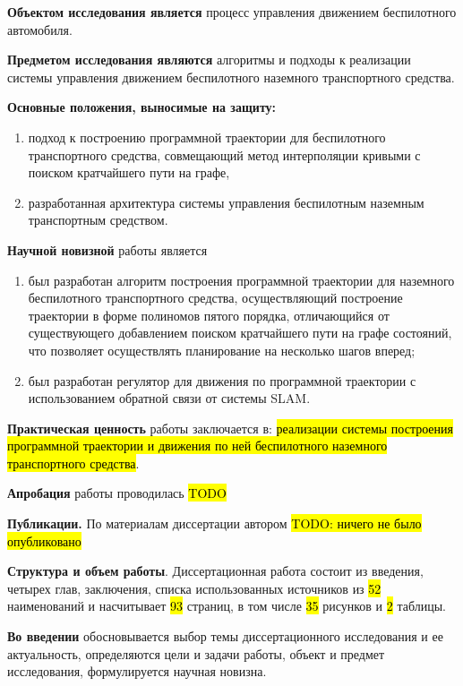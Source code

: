 \textbf{Объектом исследования является} процесс управления движением беспилотного автомобиля.

\textbf{Предметом исследования являются} алгоритмы и подходы к реализации системы управления движением
беспилотного наземного транспортного средства.

\textbf{Основные положения, выносимые на защиту:}
\begin{enumerate}
    \item подход к построению программной траектории для беспилотного транспортного средства, совмещающий метод
          интерполяции кривыми с поиском кратчайшего пути на графе,
    \item разработанная архитектура системы управления беспилотным наземным транспортным средством.
\end{enumerate}

\textbf{Научной новизной} работы является
\begin{enumerate}
    \item был разработан алгоритм построения программной траектории для наземного беспилотного транспортного
          средства, осуществляющий построение траектории в форме полиномов пятого порядка, отличающийся от существующего
          добавлением поиском кратчайшего пути на графе состояний, что позволяет осуществлять планирование на несколько
          шагов вперед;
    \item был разработан регулятор для движения по программной траектории с использованием обратной связи
          от системы SLAM.
\end{enumerate}

\textbf{Практическая ценность} работы заключается в:
\hl{реализации системы построения программной траектории и движения по ней беспилотного наземного транспортного
средства}.

\textbf{Апробация} работы проводилась \hl{TODO}

\textbf{Публикации.} По материалам диссертации автором \hl{TODO: ничего не было опубликовано}

\textbf{Структура и объем работы}. Диссертационная работа состоит из введения, четырех глав, заключения,
списка использованных источников из \hl{52} наименований и насчитывает \hl{93} страниц, в том числе \hl{35}
рисунков и \hl{2} таблицы.

\textbf{Во введении} обосновывается выбор темы диссертационного исследования и ее актуальность,
определяются цели и задачи работы, объект и предмет исследования, формулируется научная новизна.

